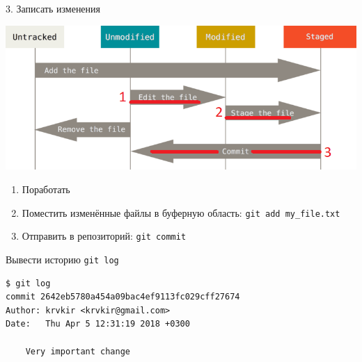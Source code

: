 \documentclass[presentation]{beamer}
\begin{document}
\begin{frame}[fragile,label={sec:orgd80fdb8}]{3. Записать изменения}
 \begin{center}
\includegraphics[height=0.5\textheight]{./01_vcs_01_git_file_states_02_change.png}
\end{center}

\begin{enumerate}
\item Поработать
\item Поместить изменённые файлы в буферную область: \texttt{git add my\_file.txt}
\item Отправить в репозиторий: \texttt{git commit}
\end{enumerate}
\end{frame}

\begin{frame}[fragile,label={sec:orge00593d}]{ Вывести историю}
 \alert{\texttt{git log}}

\begin{verbatim}
$ git log
commit 2642eb5780a454a09bac4ef9113fc029cff27674
Author: krvkir <krvkir@gmail.com>
Date:   Thu Apr 5 12:31:19 2018 +0300

    Very important change
\end{verbatim}
\end{frame}
\end{document}
